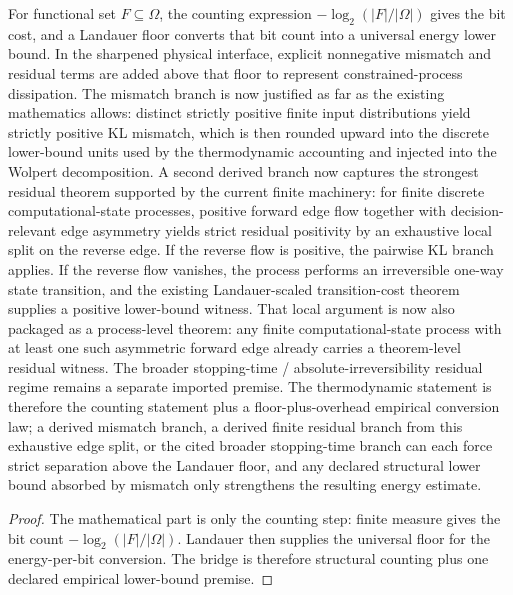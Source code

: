 \begin{theorem}\label{thm:fi-coincide}
For functional set $F \subseteq \Omega$, the counting expression $-\log_2(|F|/|\Omega|)$ gives the bit cost, and a Landauer floor converts that bit count into a universal energy lower bound. In the sharpened physical interface, explicit nonnegative mismatch and residual terms are added above that floor to represent constrained-process dissipation. The mismatch branch is now justified as far as the existing mathematics allows: distinct strictly positive finite input distributions yield strictly positive KL mismatch, which is then rounded upward into the discrete lower-bound units used by the thermodynamic accounting and injected into the Wolpert decomposition. A second derived branch now captures the strongest residual theorem supported by the current finite machinery: for finite discrete computational-state processes, positive forward edge flow together with decision-relevant edge asymmetry yields strict residual positivity by an exhaustive local split on the reverse edge. If the reverse flow is positive, the pairwise KL branch applies. If the reverse flow vanishes, the process performs an irreversible one-way state transition, and the existing Landauer-scaled transition-cost theorem supplies a positive lower-bound witness. That local argument is now also packaged as a process-level theorem: any finite computational-state process with at least one such asymmetric forward edge already carries a theorem-level residual witness. The broader stopping-time / absolute-irreversibility residual regime remains a separate imported premise. The thermodynamic statement is therefore the counting statement plus a floor-plus-overhead empirical conversion law; a derived mismatch branch, a derived finite residual branch from this exhaustive edge split, or the cited broader stopping-time branch can each force strict separation above the Landauer floor, and any declared structural lower bound absorbed by mismatch only strengthens the resulting energy estimate.
\end{theorem}

\begin{proof}
The mathematical part is only the counting step: finite measure gives the bit count $-\log_2(|F|/|\Omega|)$. Landauer then supplies the universal floor for the energy-per-bit conversion. The bridge is therefore structural counting plus one declared empirical lower-bound premise.
\end{proof}

